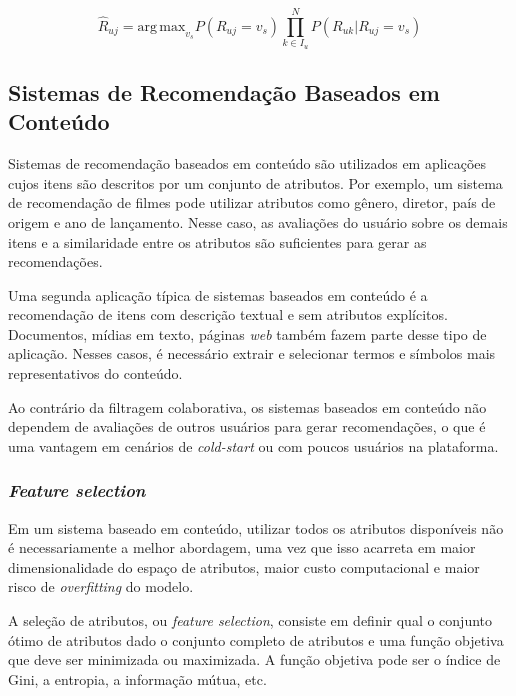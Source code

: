 \begin{equation}
    \hat{R}_{uj} = \mathrm{arg\,max}_{v_s} P(R_{uj} = v_s) \prod_{k \in I_{u}}^{N}P(R_{uk}|R_{uj} = v_s)
\end{equation}
    
\subsection{Sistemas de Recomendação Baseados em Conteúdo}

Sistemas de recomendação baseados em conteúdo são utilizados em aplicações cujos
itens são descritos por um conjunto de atributos. Por exemplo, um sistema de
recomendação de filmes pode utilizar atributos como gênero, diretor, país de
origem e ano de lançamento. Nesse caso, as avaliações do usuário sobre os demais
itens e a similaridade entre os atributos são suficientes para gerar as
recomendações.

Uma segunda aplicação típica de sistemas baseados em conteúdo é a recomendação
de itens com descrição textual e sem atributos explícitos. Documentos,
mídias em texto, páginas \textit{web} também fazem parte desse tipo de
aplicação. Nesses casos, é necessário extrair e selecionar termos e símbolos
mais representativos do conteúdo.


Ao contrário da filtragem colaborativa, os sistemas baseados em conteúdo não
dependem de avaliações de outros usuários para gerar recomendações, o que é uma
vantagem em cenários de \textit{cold-start} ou com poucos usuários na
plataforma.


\subsubsection{\textit{Feature selection}} Em um sistema baseado em conteúdo,
utilizar todos os atributos disponíveis não é necessariamente a melhor
abordagem, uma vez que isso acarreta em maior dimensionalidade do espaço de
atributos, maior custo computacional e maior risco de \textit{overfitting} do
modelo.


A seleção de atributos, ou \textit{feature selection}, consiste em definir qual
o conjunto ótimo de atributos dado o conjunto completo de
atributos e uma função objetiva que deve ser minimizada ou maximizada. A função
objetiva pode ser o índice de Gini, a entropia, a informação mútua, etc.

